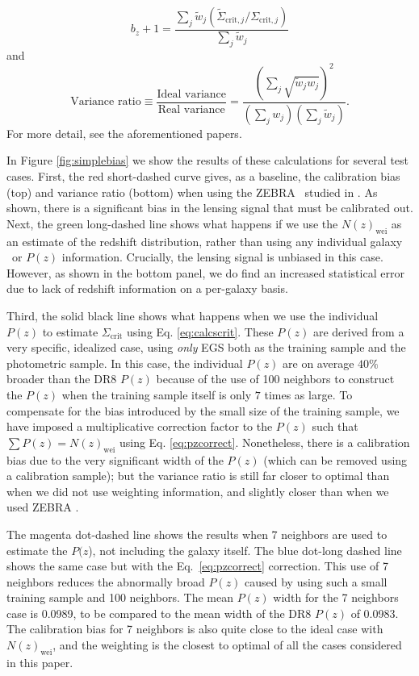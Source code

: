 \documentclass[preprint]{aastex}
\newcommand{\pofz}{$P(z$)}
\begin{document}
\noindent
\begin{equation} \label{eq:lensbias}
b_z + 1 = \frac{\sum_j \tilde{w}_j (\tilde{\Sigma}_{\mathrm{crit},j}
   / \Sigma_{\mathrm{crit},j})}{\sum_j \tilde{w}_j}
\end{equation}
and
\begin{equation} \label{eq:lensweight}
\textrm{Variance ratio}  \equiv \frac{\textrm{Ideal variance}}{\textrm{Real
     variance}} = \frac{(\sum_j \sqrt{\tilde{w}_j w_j})^2}{(\sum_j
     w_j)(\sum_j \tilde{w}_j)}.
\end{equation}
For more detail, see the aforementioned papers.

In Figure \ref{fig:simplebias} we show the results of these calculations for
several test cases.  First, the red short-dashed curve gives, as a baseline,
the calibration bias (top) and variance ratio (bottom) when using the ZEBRA
\photoz\ studied in \citet{Nakajima11}.  As shown, there is a
significant bias in the lensing signal that must be calibrated out.
Next, the green long-dashed line shows what happens if we use the
$N(z)_\mathrm{wei}$ as an estimate of the redshift distribution, rather than
using any individual galaxy \photoz\ or $P(z)$ information.  Crucially, the
lensing signal is unbiased in this case. However, as shown in the bottom
panel, we do find an increased
statistical error due to lack of redshift information on a per-galaxy basis.

Third, the solid black line shows what happens when we use the individual
$P(z)$ to estimate $\Sigma_\mathrm{crit}$ using Eq. \ref{eq:calcscrit}.  These
$P(z)$ are derived from a very specific, idealized case, using {\em only} EGS
both as the training sample and the photometric sample.  In this case, the
individual $P(z)$ are on average $40\%$ broader than the DR8 $P(z)$ because of
the use of 100 neighbors to construct the $P(z)$ when the training sample
itself is only $7$ times as large.  To compensate for the bias introduced by
the small size of the training sample, we have imposed a multiplicative
correction factor to the $P(z)$ such that $\sum P(z) = N(z)_\mathrm{wei}$ using
Eq. \ref{eq:pzcorrect}.  Nonetheless, there is a calibration bias due to the
very significant width of the $P(z)$ (which can be removed using a calibration
sample); but the variance ratio is still far closer to optimal than when we did
not use weighting information, and slightly closer than when we used ZEBRA
\photoz.  

The magenta dot-dashed line shows the results when 7 neighbors are used to
estimate the \pofz, not including the galaxy itself. The blue dot-long dashed
line shows the same case but with the Eq.~\ref{eq:pzcorrect} correction.  This
use of 7 neighbors reduces the abnormally broad $P(z)$ caused by using such a
small training sample and 100 neighbors.  The mean $P(z)$ width for the 7
neighbors case is 0.0989, to be compared to the mean width of the DR8 $P(z)$ of
0.0983. The calibration bias for 7 neighbors is also quite close to the ideal
case with $N(z)_\mathrm{wei}$, and the weighting is the closest to optimal of
all the cases considered in this paper.
\end{document}
